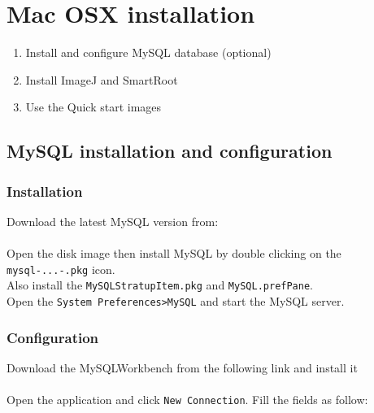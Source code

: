 
\newpage

{\color{coolSection}\section{Mac OSX installation}}

\begin{enumerate}
\item Install and configure MySQL database (optional)
\item Install ImageJ and SmartRoot
\item Use the Quick start images
\end{enumerate}

{\color{coolSubSection}\subsection{MySQL installation and configuration}}
\label{dbmac}

\subsubsection{Installation}
Download the latest MySQL version from:\\ 

\noindent {}\\

\noindent
Open the disk image then install MySQL by double clicking on the \verb|mysql-...-.pkg| icon. \\
Also install the \verb|MySQLStratupItem.pkg| and \verb|MySQL.prefPane|.\\

\noindent
Open the \verb|System Preferences>MySQL| and start the MySQL server.

\subsubsection{Configuration}

Download the MySQLWorkbench from the following link and install it \\

\noindent {}\\

\noindent 
Open the application and click \verb|New Connection|. Fill the fields as follow:\\

